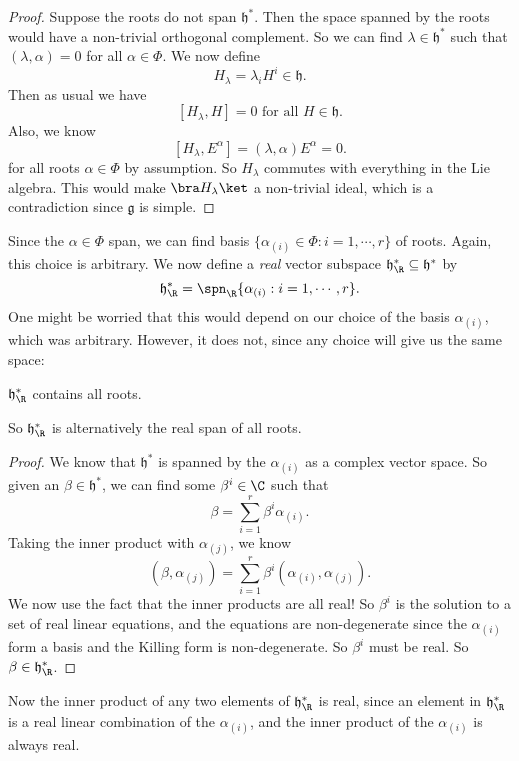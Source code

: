 \documentclass[a4paper]{article}
\begin{document}
\begin{proof}
  Suppose the roots do not span $\mathfrak{h}^*$. Then the space spanned by the roots would have a non-trivial orthogonal complement. So we can find $\lambda \in \mathfrak{h}^*$ such that $(\lambda, \alpha) = 0$ for all $\alpha \in \Phi$.
  We now define
  \[
    H_{\lambda} = \lambda_i H^i \in \mathfrak{h}.
  \]
  Then as usual we have
  \[
    [H_\lambda, H] = 0\text{ for all }H \in \mathfrak{h}.
  \]
  Also, we know
  \[
    [H_\lambda, E^\alpha] = (\lambda, \alpha) E^\alpha = 0.
  \]
  for all roots $\alpha \in \Phi$ by assumption. So $H_\lambda$ commutes with everything in the Lie algebra. This would make $\bra H_\lambda\ket$ a non-trivial ideal, which is a contradiction since $\mathfrak{g}$ is simple.
\end{proof}
Since the $\alpha \in \Phi$ span, we can find basis $\{\alpha_{(i)} \in \Phi: i = 1, \cdots, r\}$ of roots. Again, this choice is arbitrary. We now define a \emph{real} vector subspace $\mathfrak{h}_\R^* \subseteq \mathfrak{h}^*$ by
\[
  \mathfrak{h}_\R^* = \spn_\R\{\alpha_{(i)}: i = 1, \cdots, r\}.
\]
One might be worried that this would depend on our choice of the basis $\alpha_{(i)}$, which was arbitrary. However, it does not, since any choice will give us the same space:
\begin{prop}
  $\mathfrak{h}_\R^*$ contains all roots.
\end{prop}
So $\mathfrak{h}_\R^*$ is alternatively the real span of all roots.

\begin{proof}
  We know that $\mathfrak{h}^*$ is spanned by the $\alpha_{(i)}$ as a complex vector space. So given an $\beta \in \mathfrak{h}^*$, we can find some $\beta^i \in \C$ such that
  \[
    \beta = \sum_{i = 1}^r \beta^i \alpha_{(i)}.
  \]
  Taking the inner product with $\alpha_{(j)}$, we know
  \[
    (\beta, \alpha_{(j)}) = \sum_{i = 1}^r \beta^i(\alpha_{(i)}, \alpha_{(j)}).
  \]
  We now use the fact that the inner products are all real! So $\beta^i$ is the solution to a set of real linear equations, and the equations are non-degenerate since the $\alpha_{(i)}$ form a basis and the Killing form is non-degenerate. So $\beta^i$ must be real. So $\beta \in \mathfrak{h}^*_\R$.
\end{proof}

Now the inner product of any two elements of $\mathfrak{h}_\R^*$ is real, since an element in $\mathfrak{h}_\R^*$ is a real linear combination of the $\alpha_{(i)}$, and the inner product of the $\alpha_{(i)}$ is always real.
\end{document}
